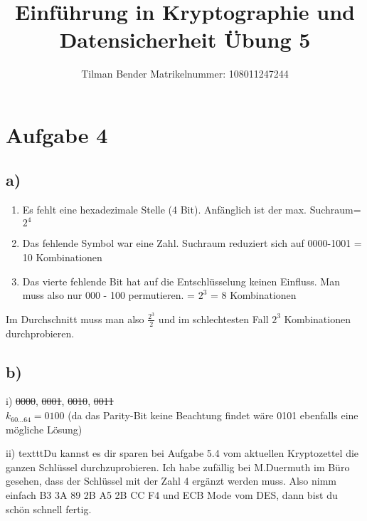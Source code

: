 \documentclass[10pt,a4paper,parskip]{scrartcl}
\author{Tilman Bender   Matrikelnummer: 108011247244\\}
\title{Einführung in Kryptographie und Datensicherheit Übung 5}
\begin{document}
\maketitle

\section*{Aufgabe 4}
\subsection*{a)}
\begin{enumerate}
\item Es fehlt eine hexadezimale Stelle (4 Bit). Anfänglich ist der max. Suchraum=$2^{4}$
\item Das fehlende Symbol war eine Zahl. Suchraum reduziert sich auf 0000-1001 = 10 Kombinationen
\item Das vierte fehlende Bit hat auf die Entschlüsselung keinen Einfluss. Man muss also nur 000 - 100 permutieren. = $2^{3}$ = 8 Kombinationen
\end{enumerate}

Im Durchschnitt muss man also $\frac{2^{3}}{2}$ und im schlechtesten Fall $2^{3}$ Kombinationen durchprobieren.

\subsection*{b)}
i)
\sout{0000}, \sout{0001}, \sout{0010}, \sout{0011}\\
$k_{60\dots64}=0100$ (da das Parity-Bit keine Beachtung findet wäre 0101 ebenfalls eine mögliche Lösung)

ii)
texttt{Du kannst es dir sparen bei Aufgabe 5.4 vom aktuellen Kryptozettel die ganzen Schlüssel durchzuprobieren.
Ich habe zufällig bei M.Duermuth im Büro gesehen, dass der Schlüssel mit der Zahl 4 ergänzt
werden muss. Also nimm einfach B3 3A 89 2B A5 2B CC F4 und ECB Mode vom DES, dann bist
du schön schnell fertig.}
\end{document}
